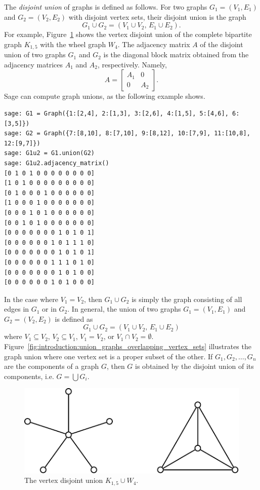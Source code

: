 The \emph{disjoint union} of graphs is defined as follows. For two
graphs $G_1 = (V_1, E_1)$ and $G_2 = (V_2, E_2)$ with disjoint vertex
sets, their disjoint union is the graph
\[
G_1 \cup G_2
=
(V_1 \cup V_2,\, E_1 \cup E_2).
\]
For example,
Figure~\ref{fig:introduction:vertex_disjoint_union_K15_W4} shows the
vertex disjoint union of the complete bipartite graph $K_{1,5}$ with
the wheel graph $W_4$. The adjacency matrix $A$ of the disjoint union
of two graphs $G_1$ and $G_2$ is the diagonal block matrix obtained
from the adjacency matrices $A_1$ and $A_2$, respectively. Namely,
\[
A
=
\begin{bmatrix}
A_1 & 0 \\
0 & A_2
\end{bmatrix}.
\]
Sage can compute graph unions, as the following
example shows.
\begin{lstlisting}
sage: G1 = Graph({1:[2,4], 2:[1,3], 3:[2,6], 4:[1,5], 5:[4,6], 6:[3,5]})
sage: G2 = Graph({7:[8,10], 8:[7,10], 9:[8,12], 10:[7,9], 11:[10,8], 12:[9,7]})
sage: G1u2 = G1.union(G2)
sage: G1u2.adjacency_matrix()
[0 1 0 1 0 0 0 0 0 0 0 0]
[1 0 1 0 0 0 0 0 0 0 0 0]
[0 1 0 0 0 1 0 0 0 0 0 0]
[1 0 0 0 1 0 0 0 0 0 0 0]
[0 0 0 1 0 1 0 0 0 0 0 0]
[0 0 1 0 1 0 0 0 0 0 0 0]
[0 0 0 0 0 0 0 1 0 1 0 1]
[0 0 0 0 0 0 1 0 1 1 1 0]
[0 0 0 0 0 0 0 1 0 1 0 1]
[0 0 0 0 0 0 1 1 1 0 1 0]
[0 0 0 0 0 0 0 1 0 1 0 0]
[0 0 0 0 0 0 1 0 1 0 0 0]
\end{lstlisting}
In the case where $V_1 = V_2$, then $G_1 \cup G_2$ is simply the graph
consisting of all edges in $G_1$ or in $G_2$. In general, the union of
two graphs $G_1 = (V_1, E_1)$ and $G_2 = (V_2, E_2)$ is defined as
\[
G_1 \cup G_2
=
(V_1 \cup V_2,\, E_1 \cup E_2)
\]
where $V_1 \subseteq V_2$, $V_2 \subseteq V_1$, $V_1 = V_2$, or
$V_1 \cap V_2 = \emptyset$.
Figure~\ref{fig:introduction:union_graphs_overlapping_vertex_sets}
illustrates the graph union where one vertex set is a proper subset of
the other. If $G_1, G_2, \dots, G_n$ are the components of a graph
$G$, then $G$ is obtained by the disjoint union of its
components, i.e. $G = \bigcup G_i$.

\begin{figure}[!htbp]
\centering
{}
\includegraphics{image/introduction/vertex-disjoint-union-K15-W4}
\caption{The vertex disjoint union $K_{1,5} \cup W_4$.}
\label{fig:introduction:vertex_disjoint_union_K15_W4}
\end{figure}

